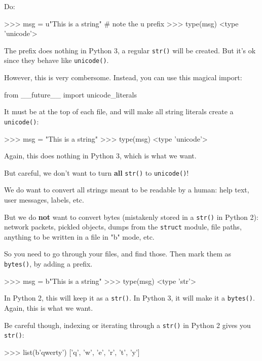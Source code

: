 Do:

\begin{py2}
>>> msg = u"This is a string" # note the u prefix
>>> type(msg)
<type 'unicode'>
\end{py2}

The  prefix does nothing in Python 3, a regular \lstinline{str()} will be created. But it's ok since they behave like \lstinline{unicode()}.

However, this is very combersome. Instead, you can use this magical import:

\begin{py2}
from __future__ import unicode_literals
\end{py2}

It must be at the top of each file, and will make all string literals create a \lstinline{unicode()}:

\begin{py2}
>>> msg = "This is a string"
>>> type(msg)
<type 'unicode'>
\end{py2}

Again, this does nothing in Python 3, which is what we want.

But careful, we don't want to turn  \textbf{all} \lstinline{str()} to \lstinline{unicode()}!

We do want to convert all strings meant to be readable by a human: help text, user messages, labels, etc.

But we do \textbf{not} want to convert bytes (mistakenly stored in a \lstinline{str()} in Python 2): network packets, pickled objects, dumps from the \lstinline{struct} module, file paths, anything to be written in a file in "b" mode, etc.

So you need to go through your files, and find those. Then mark them as \lstinline{bytes()}, by adding a  prefix.

\begin{py2}
>>> msg = b"This is a string"
>>> type(msg)
<type 'str'>
\end{py2}

In Python 2, this will keep it as a \lstinline{str()}. In Python 3, it will make it a \lstinline{bytes()}. Again, this is what we want.

Be careful though, indexing or iterating through a \lstinline{str()} in Python 2 gives you \lstinline{str()}:

\begin{py2}
>>> list(b'qwerty')
['q', 'w', 'e', 'r', 't', 'y']
\end{py2}

